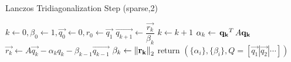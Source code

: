 \begin{frame}[plain]
	\begin{block}{}
\begin{algorithm}[H]
%
  \caption{Lanczos Tridiagonalization Step (sparse,2)}
  \DontPrintSemicolon
%
%
%
    $k \gets 0, \beta_0 \gets 1, \vec{q_0} \gets 0, r_0 \gets \vec{q_1}$ \;
    {
      $\vec{q_{k+1}} \gets \dfrac{\vec{r_k}}{\beta_k}$ \;
      $k \gets k + 1$ \;
      $\alpha_k \gets \,{\mathbf{q_k}}^{T}\,A\mathbf{q_k}$ \;
      $\vec{r_k} \gets A\vec{q_k} - \alpha_kq_k - \beta_{k-1}\vec{q_{k-1}}$ \;
      $\beta_k \gets \left\lVert \mathbf{r_k} \right\rVert_2$ \;
    }
%
    return $(\{\alpha_i\}, \{\beta_i\}, 
             Q = [ \vec{q_1} | \vec{q_2} | \cdots ])$ \;
\end{algorithm}
\hfill
	\end{block} 
\end{frame}
